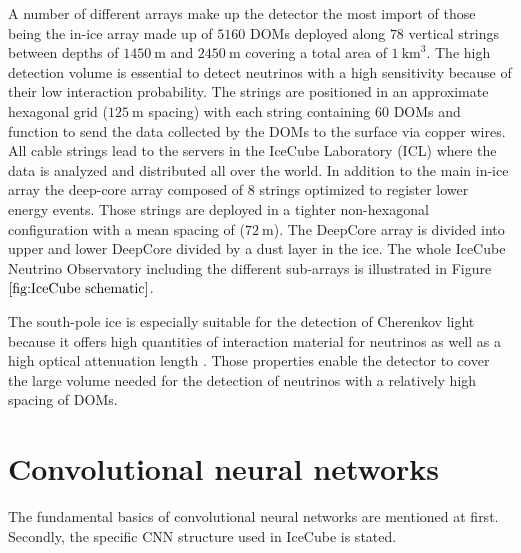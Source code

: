 \documentclass[
  tucolor,       %
  BCOR=12mm,     %
  parskip=half,  %
  open=any,      %
  cleardoublepage=plain,  %
]{tudothesis}
\begin{document}
A number of different arrays make up the detector the most import of those being the in-ice array made up of $5160$ DOMs deployed along $78$ vertical strings between depths of $\SI{1450}{\meter}$ and $\SI{2450}{\meter}$ covering a total area of $\SI{1}{\kilo\meter}^3$. 
The high detection volume is essential to detect neutrinos with a high sensitivity because of their low interaction probability. 
The strings are positioned in an approximate hexagonal grid ($\SI{125}{\meter}$ spacing) with each string containing $60$ DOMs and function to send the data collected by the DOMs to the surface via copper wires. All cable strings lead to the servers in the IceCube Laboratory (ICL) where the data is analyzed and distributed all over the world.
In addition to the main in-ice array the deep-core array composed of 8 strings optimized to register lower energy events.
Those strings are deployed in a tighter non-hexagonal configuration with a mean spacing of ($\SI{72}{\meter}$). The DeepCore array is divided into upper and lower DeepCore divided by a dust layer in the ice.
The whole IceCube Neutrino Observatory including the different sub-arrays is illustrated in Figure $\ref{fig:IceCube schematic}$.

The south-pole ice is especially suitable for the detection of Cherenkov light because it offers high quantities of interaction material for neutrinos as well as a high optical attenuation length \cite{Aartsen_2017}.
Those properties enable the detector to cover the large volume needed for the detection of neutrinos with a relatively high spacing of DOMs.  \cite{Aartsen_2017}
\section{Convolutional neural networks}
The fundamental basics of convolutional neural networks are mentioned at first.
Secondly, the specific CNN structure used in IceCube is stated.
\end{document}

